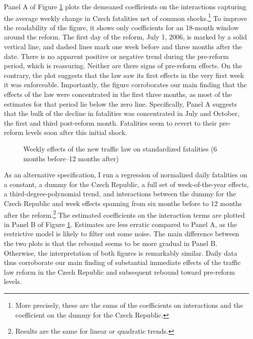 \documentclass[12pt]{article}
\begin{document}
Panel A of Figure \ref{fig:days} plots the demeaned coefficients on the
interactions capturing the average weekly change in Czech fatalities net of
common shocks.\footnote{More precisely, these are the sums of the coefficients
  on interactions and the coefficient on the dummy for the Czech Republic.} To
improve the readability of the figure, it shows only coefficients for an
18-month window around the reform.  The first day of the reform, July 1, 2006,
is marked by a solid vertical line, and dashed lines mark one week before and
three months after the date. There is no apparent positive or negative trend
during the pre-reform period, which is reassuring.  Neither are there signs of
pre-reform effects. On the contrary, the plot suggests that the law saw its
first effects in the very first week it was enforceable.  Importantly, the
figure corroborates our main finding that the effects of the law were
concentrated in the first three months, as most of the estimates for that period
lie below the zero line.  Specifically, Panel A suggests that the bulk of the
decline in fatalities was concentrated in July and October, the first and third
post-reform month.  Fatalities seem to revert to their pre-reform levels soon
after this initial shock. 

\begin{figure}[t] 
  \caption{Weekly effects of the new traffic law on standardized fatalities (6
  months before--12 months after)}
  \label{fig:days} 
\end{figure}

As an alternative specification, I run a regression of normalized daily
fatalities on a constant, a dummy for the Czech Republic, a full set of
week-of-the-year effects, a third-degree-polynomial trend, and interactions
between the dummy for the Czech Republic and week effects spanning from six
months before to 12 months after the reform.\footnote{Results are the same for
  linear or quadratic trends.} The estimated coefficients on the interaction
terms are plotted in Panel B of Figure \ref{fig:days}. Estimates are less
erratic compared to Panel A, as the restrictive model is likely to filter out
some noise. The main difference between the two plots is that the rebound seems
to be more gradual in Panel B. Otherwise, the interpretation of both figures is
remarkably similar. Daily data thus corroborate our main finding of substantial
immediate effects of the traffic law reform in the Czech Republic and subsequent
rebound toward pre-reform levels.
\end{document}
